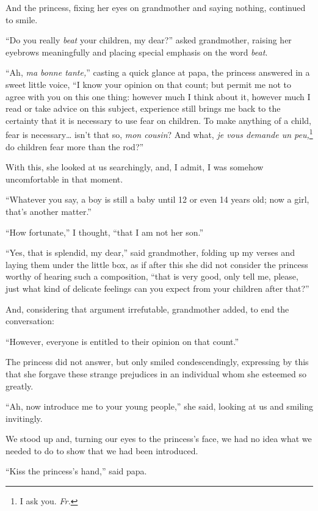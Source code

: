 And the princess, fixing her eyes on grandmother and saying nothing, continued to smile.

``Do you really \textit{beat} your children, my dear?'' asked grandmother, raising her eyebrows meaningfully and placing special emphasis on the word \textit{beat}. %

``Ah, \textit{ma bonne tante,}'' casting a quick glance at papa, the princess answered in a sweet little voice, ``I know your opinion on that count; but permit me not to agree with you on this one thing: however much I think about it, however much I read or take advice on this subject, experience still brings me back to the certainty that it is necessary to use fear on children. To make anything of a child, fear is necessary\ldots{} isn't that so, \textit{mon cousin}? And what, \textit{je vous demande un peu,}\footnote{I ask you. \textit{Fr.}} do children fear more than the rod?'' %

With this, she looked at us searchingly, and, I admit, I was somehow uncomfortable in that moment.

``Whatever you say, a boy is still a baby until 12 or even 14 years old; now a girl, that's another matter.'' %

``How fortunate,'' I thought, ``that I am not her son.'' %

``Yes, that is splendid, my dear,'' said grandmother, folding up my verses and laying them under the little box, as if after this she did not consider the princess worthy of hearing such a composition, ``that is very good, only tell me, please, just what kind of delicate feelings can you expect from your children after that?'' %

And, considering that argument irrefutable, grandmother added, to end the conversation:

``However, everyone is entitled to their opinion on that count.'' %

The princess did not answer, but only smiled condescendingly, expressing by this that she forgave these strange prejudices in an individual whom she esteemed so greatly.

``Ah, now introduce me to your young people,'' she said, looking at us and smiling invitingly. %

We stood up and, turning our eyes to the princess's face, we had no idea what we needed to do to show that we had been introduced.

``Kiss the princess's hand,'' said papa. %

